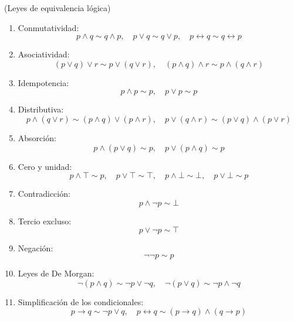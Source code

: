\begin{theorem}(Leyes de equivalencia lógica)\label{eq}
\begin{enumerate}
    \item Conmutatividad: $$p \land q \sim q \land p, \quad p \lor q \sim q \lor p, \quad p \leftrightarrow q \sim q \leftrightarrow p$$
    \item Asociatividad: $$(p \lor q) \lor r \sim p \lor (q \lor r), \quad (p \land q) \land r \sim p \land (q \land r)$$
    \item Idempotencia: $$p \land p \sim p, \quad p \lor p \sim p$$
    \item Distributiva: $$p \land (q  \lor r) \sim (p \land q) \lor (p \land r), \quad p \lor (q \land r) \sim (p \lor q) \land (p \lor r)$$
    \item Absorción: $$p \land (p \lor q) \sim p, \quad p \lor (p \land q) \sim p$$
    \item Cero y unidad: $$p \land \top \sim p, \quad p \lor \top \sim \top, \quad p \land \bot \sim \bot, \quad p \lor \bot \sim p$$
    \item Contradicción: $$p \land \neg p \sim \bot$$
    \item Tercio excluso: $$p \lor \neg p \sim \top$$
    \item Negación: $$\neg \neg p \sim p$$
    \item Leyes de De Morgan: $$\neg(p \land q) \sim \neg p \lor \neg q, \quad \neg(p \lor q) \sim \neg p \land \neg q$$
    \item Simplificación de los condicionales: $$p \rightarrow q \sim \neg p \lor q, \quad p \leftrightarrow q \sim (p \rightarrow q) \land (q \rightarrow p)$$
\end{enumerate}
\end{theorem}

